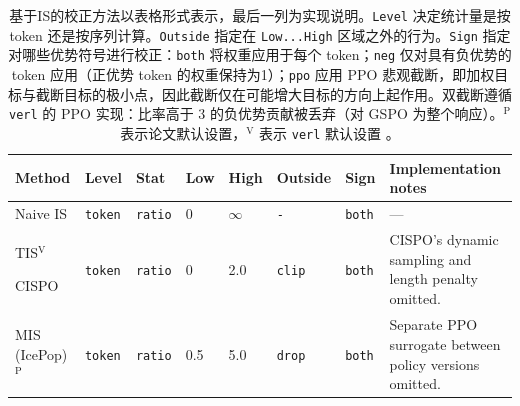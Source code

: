 \begin{table}[t]
    \centering
    \caption{基于IS的校正方法以表格形式表示，最后一列为实现说明。\texttt{Level} 决定统计量是按 token 还是按序列计算。\texttt{Outside} 指定在 \texttt{Low...High} 区域之外的行为。\texttt{Sign} 指定对哪些优势符号进行校正：\texttt{both} 将权重应用于每个 token；\texttt{neg} 仅对具有负优势的 token 应用（正优势 token 的权重保持为1）；\texttt{ppo} 应用 PPO 悲观截断，即加权目标与截断目标的极小点，因此截断仅在可能增大目标的方向上起作用。双截断遵循 \texttt{verl} 的 PPO 实现：比率高于 $3$  的负优势贡献被丢弃（对 GSPO 为整个响应）。$^{\mathrm P}$  表示论文默认设置，$^{\mathrm V}$  表示 \texttt{verl} 默认设置 \citep{verl}。}
    \label{tab:is_methods}
    \small
    \setlength{\arrayrulewidth}{0.3pt}
    \setlength{\tabcolsep}{3pt}
    \renewcommand{\arraystretch}{1.3}
    \begin{tabular}{@{}>{\raggedright\arraybackslash}m{70pt}
        >{\centering\arraybackslash}m{25pt}
        >{\centering\arraybackslash}m{24pt}
        >{\centering\arraybackslash}m{30pt}
        >{\centering\arraybackslash}m{30pt}
        >{\centering\arraybackslash}m{32pt}
        >{\centering\arraybackslash}m{22pt}
        >{\raggedright\arraybackslash}m{\dimexpr\linewidth-275pt\relax}@{}}
        \hline
        \rowcolor{gridgray}
        \textbf{Method} & \textbf{Level} & \textbf{Stat} & \textbf{Low} & \textbf{High} & \textbf{Outside} & \textbf{Sign} & \textbf{Implementation notes} \\
        \hline
        \cellcolor{gridgray}Naive IS \citep{reinforce} & \cellcolor{deep0!12}\texttt{token} & \cellcolor{tblteal!12}\texttt{ratio} & \cellcolor{deep1!50}0 & \cellcolor{deep1!50}$\infty$ & \cellcolor{gentlelilac!5}\texttt{-} & \cellcolor{deep2!30}\texttt{both} & --- \\
        \hline
        \cellcolor{gridgray}TIS$^{\mathrm V}$ \citep{tis}\par CISPO \citep{cispo} & \cellcolor{deep0!12}\texttt{token} & \cellcolor{tblteal!12}\texttt{ratio} & \cellcolor{deep1!50}0 & \cellcolor{deep1!30}2.0 & \cellcolor{gentlelilac!30}\texttt{clip} & \cellcolor{deep2!30}\texttt{both} & CISPO's dynamic sampling and length penalty omitted. \\
        \hline
        \cellcolor{gridgray}MIS (IcePop)$^{\mathrm P}$ \citep{icepop} & \cellcolor{deep0!12}\texttt{token} & \cellcolor{tblteal!12}\texttt{ratio} & \cellcolor{deep1!30}0.5 & \cellcolor{deep1!30}5.0 & \cellcolor{gentlelilac!10}\texttt{drop} & \cellcolor{deep2!30}\texttt{both} & Separate PPO surrogate between policy versions omitted. \\

\end{tabular}
\end{table}
